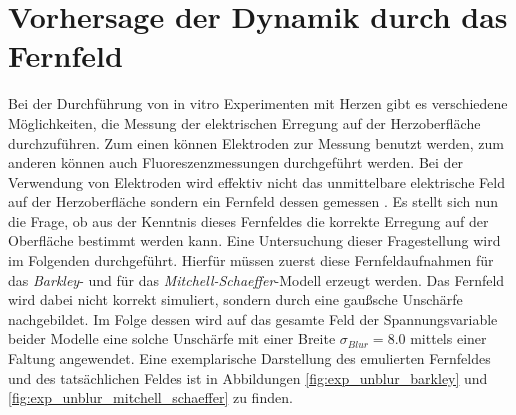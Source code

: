 \clearpage
\section{Vorhersage der Dynamik durch das Fernfeld}
\label{sec:exp_unblur}
Bei der Durchführung von in vitro Experimenten mit Herzen gibt es verschiedene Möglichkeiten, die Messung der elektrischen Erregung auf der Herzoberfläche durchzuführen. Zum einen können Elektroden zur Messung benutzt werden, zum anderen können auch Fluoreszenzmessungen durchgeführt werden. Bei der Verwendung von Elektroden wird effektiv nicht das unmittelbare elektrische Feld auf der Herzoberfläche sondern ein Fernfeld dessen gemessen \citep{berdondini2005high, ramanathan2004noninvasive}. Es stellt sich nun die Frage, ob aus der Kenntnis dieses Fernfeldes die korrekte Erregung auf der Oberfläche bestimmt werden kann. Eine Untersuchung dieser Fragestellung wird im Folgenden durchgeführt. Hierfür müssen zuerst diese Fernfeldaufnahmen für das \textit{Barkley}- und für das \textit{Mitchell-Schaeffer}-Modell erzeugt werden. Das Fernfeld wird dabei nicht korrekt simuliert, sondern durch eine gaußsche Unschärfe nachgebildet. Im Folge dessen wird auf das gesamte Feld der Spannungsvariable beider Modelle eine solche Unschärfe mit einer Breite $\sigma_{Blur} = 8.0$ mittels einer Faltung angewendet. Eine exemplarische Darstellung des emulierten Fernfeldes und des tatsächlichen Feldes ist in Abbildungen \ref{fig:exp_unblur_barkley} und \ref{fig:exp_unblur_mitchell_schaeffer} zu finden.

